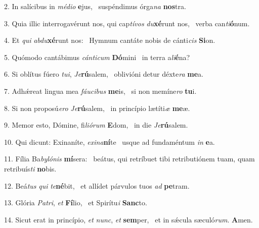 2. In salícibus in \textit{mé}\textit{di}\textit{o} \textbf{e}jus, \ast\  suspéndimus órga\textit{na} \textbf{nos}tra.\

3. Quia illic interrogavérunt nos, qui cap\textit{tí}\textit{vos} \textit{du}\textbf{xé}runt nos, \ast\  verba can\textit{ti}\textbf{ó}num.\

4. Et \textit{qui} \textit{ab}\textit{du}\textbf{xé}runt nos: \ast\  Hymnum cantáte nobis de cánti\textit{cis} \textbf{Si}on.\

5. Quómodo cantábimus \textit{cán}\textit{ti}\textit{cum} \textbf{Dó}mini \ast\  in terra a\textit{li}\textbf{é}na?\

6. Si oblítus fúero \textit{tu}\textit{i}, \textit{Je}\textbf{rú}salem, \ast\  oblivióni detur déxte\textit{ra} \textbf{me}a.\

7. Adhǽreat lingua mea \textit{fáu}\textit{ci}\textit{bus} \textbf{me}is, \ast\  si non memíne\textit{ro} \textbf{tu}i.\

8. Si non proposú\textit{e}\textit{ro} \textit{Je}\textbf{rú}salem, \ast\  in princípio lætíti\textit{æ} \textbf{me}æ.\

9. Memor esto, Dómine, fi\textit{li}\textit{ó}\textit{rum} \textbf{E}dom, \ast\  in die \textit{Je}\textbf{rú}salem.\

10. Qui dicunt: Exinaníte, \textit{ex}\textit{i}\textit{na}\textbf{ní}te \ast\  usque ad fundaméntum \textit{in} \textbf{e}a.\

11. Fília Ba\textit{by}\textit{ló}\textit{nis} \textbf{mí}sera: \ast\  beátus, qui retríbuet tibi retributiónem tuam, quam retribuís\textit{ti} \textbf{no}bis.\

12. Beá\textit{tus} \textit{qui} \textit{te}\textbf{né}bit, \ast\  et allídet párvulos tuos \textit{ad} \textbf{pe}tram.\

13. Glória \textit{Pa}\textit{tri}, \textit{et} \textbf{Fí}lio, \ast\  et Spirítu\textit{i} \textbf{Sanc}to.\

14. Sicut erat in princípio, \textit{et} \textit{nunc}, \textit{et} \textbf{sem}per, \ast\  et in sǽcula sæculó\textit{rum}. \textbf{A}men.\


